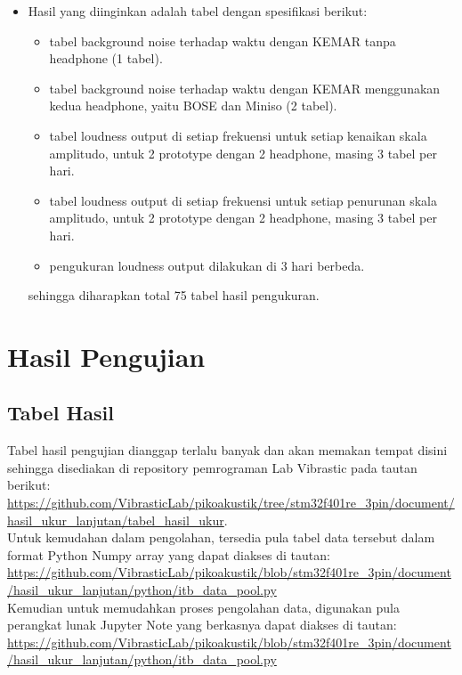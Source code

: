 \documentclass[12pt,]{article}
\begin{document}
\begin{itemize}
		\item Hasil yang diinginkan adalah tabel dengan spesifikasi berikut:
		\begin{itemize}
			\item tabel background noise terhadap waktu dengan KEMAR tanpa headphone (1 tabel).
			\item tabel background noise terhadap waktu dengan KEMAR menggunakan kedua headphone, yaitu BOSE dan Miniso (2 tabel).
			\item tabel loudness output di setiap frekuensi untuk setiap kenaikan skala amplitudo, untuk 2 prototype dengan 2 headphone, masing 3 tabel per hari.
			\item tabel loudness output di setiap frekuensi untuk setiap penurunan skala amplitudo, untuk 2 prototype dengan 2 headphone, masing 3 tabel per hari.
			\item pengukuran loudness output dilakukan di 3 hari berbeda.
		\end{itemize}
	
		sehingga diharapkan total 75 tabel hasil pengukuran.
	\end{itemize}

	\newpage
	\section{Hasil Pengujian}
	
	\subsection{Tabel Hasil}
	
	Tabel hasil pengujian dianggap terlalu banyak dan akan memakan tempat disini sehingga disediakan di repository pemrograman Lab Vibrastic pada tautan berikut:\\
	\url{https://github.com/VibrasticLab/pikoakustik/tree/stm32f401re_3pin/document/hasil_ukur_lanjutan/tabel_hasil_ukur}.\\
	
	Untuk kemudahan dalam pengolahan, tersedia pula tabel data tersebut dalam format Python Numpy array yang dapat diakses di tautan:\\
	\url{https://github.com/VibrasticLab/pikoakustik/blob/stm32f401re_3pin/document/hasil_ukur_lanjutan/python/itb_data_pool.py}\\
	
	Kemudian untuk memudahkan proses pengolahan data, digunakan pula perangkat lunak Jupyter Note yang berkasnya dapat diakses di tautan:\\
	\url{https://github.com/VibrasticLab/pikoakustik/blob/stm32f401re_3pin/document/hasil_ukur_lanjutan/python/itb_data_pool.py}\\
	
\end{document}
